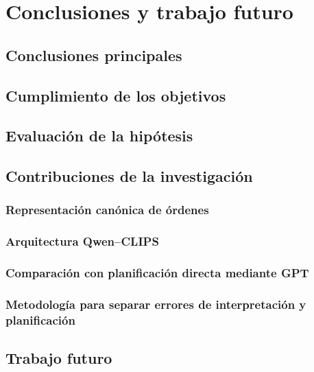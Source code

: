 \chapter{Conclusiones y trabajo futuro}

\section{Conclusiones principales}

\section{Cumplimiento de los objetivos}

\section{Evaluación de la hipótesis}

\section{Contribuciones de la investigación}

\subsection{Representación canónica de órdenes}

\subsection{Arquitectura Qwen--CLIPS}

\subsection{Comparación con planificación directa mediante GPT}

\subsection{Metodología para separar errores de interpretación y planificación}

\section{Trabajo futuro}